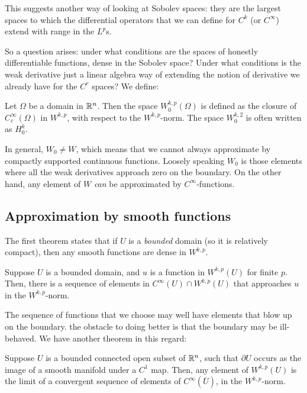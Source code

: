 \documentclass[a4paper]{amsart}
\begin{document}
This suggests another way of looking at Sobolev spaces: they are the
largest spaces to which the differential operators that we can define
for $C^k$ (or $C^\infty$) extend with range in the $L^p$s.

So a question arises: under what conditions are the spaces of honestly
differentiable functions, dense in the Sobolev space? Under what
conditions is the weak derivative just a linear algebra way of
extending the notion of derivative we already have for the $C^r$
spaces? We define:

\begin{definer}
  Let $\Omega$ be a domain in $\mathbb{R}^n$. Then the space
  $W_0^{k,p}(\Omega)$ is defined as the closure of
  $C_c^\infty(\Omega)$ in $W^{k,p}$, with respect to the
  $W^{k,p}$-norm. The space $W_0^{k,2}$ is often written as $H_0^k$.
\end{definer}

In general, $W_0 \ne W$, which means that we cannot always approximate
by compactly supported continuous functions. Loosely speaking $W_0$ is
those elements where all the weak derivatives approach zero on the
boundary. On the other hand, any element of $W$ {\em can} be
approximated by $C^\infty$-functions.

\subsection{Approximation by smooth functions}

The first theorem states that if $U$ is a {\em bounded} domain (so it
is relatively compact), then any smooth functions are dense in
$W^{k,p}$.

\begin{theorem}
  Suppose $U$ is a bounded domain, and $u$ is a function in
  $W^{k,p}(U)$ for finite $p$. Then, there is a sequence of elements
  in $C^\infty(U) \cap W^{k,p}(U)$ that approaches $u$ in the
  $W^{k,p}$-norm.
\end{theorem}

The sequence of functions that we choose may well have elements that
blow up on the boundary. the obstacle to doing better is that the
boundary may be ill-behaved. We have another theorem in this regard:

\begin{theorem}
  Suppose $U$ is a bounded connected open subset of $\mathbb{R}^n$, such that
  $\partial U$ occurs as the image of a smooth manifold under a $C^1$
  map. Then, any element of $W^{k,p}(U)$ is the limit of a convergent
  sequence of elements of $C^\infty(\overline{U})$, in the
  $W^{k,p}$-norm.
\end{theorem}
\end{document}
